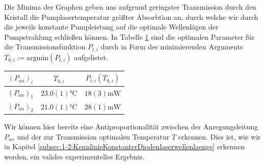 \documentclass[../../main.tex]{subfiles}
\begin{document}
    Die Minima der Graphen geben uns aufgrund geringster Transmission durch den Kristall die Pumplasertemperatur größter Absorbtion an, durch welche wir durch die jeweils konstante Pumpleistung auf die optimale Wellenlägen der Pumpstrahlung schließen können. In Tabelle \ref{tab:1-1:OptimaleParameterSpektrum} sind die optimalen Parameter für die Transmissionsfunktion $P_{t,i}$ durch in Form des minimierenden Arguments $T_{0,i}:=\text{argmin}(P_{t,i})$ aufgelistet. 
    \begin{table}[H]
        \centering
        \begin{tabular}{c|cc}
            \hline
            $(P_{\textit{an}})_i$ & $T_{0,i}$ & $P_{t,i}(T_{0,i})$ \\
            \hline\hline
            $(P_{\textit{an}})_1$ & $23.0(1)\si{\celsius}$ & $18(3)\si{\mW}$ \\
            $(P_{\textit{an}})_2$ & $21.0(1)\si{\celsius}$ & $28(1)\si{\mW}$ \\
        \end{tabular}
        \label{tab:1-1:OptimaleParameterSpektrum}
    \end{table}
    Wir können hier bereits eine Antiproportionalität zwischen der Anregungsleitung $P_{\textit{an}}$ und der zur Transmission optimalen Temperatur $T$ erkennen. Dies ist, wie wir in Kapitel \ref{subsec:1-2:KennlinieKonstanterDiodenlaserwellenlaenge} erkennen werden, ein valides experimentelles Ergebnis.
\end{document}
